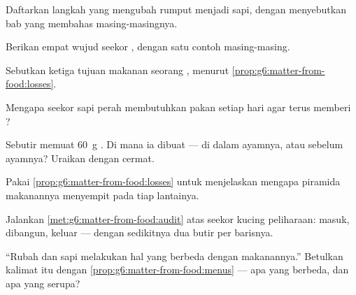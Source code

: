 \begin{exercise}[$\star$]\label{exo:g6:matter-from-food:2}
Daftarkan langkah yang mengubah rumput menjadi  sapi, dengan
menyebutkan bab yang membahas masing-masingnya.
\end{exercise}

\begin{exercise}[$\star$]\label{exo:g6:matter-from-food:3}
Berikan empat wujud  seekor , dengan satu contoh
masing-masing.
\end{exercise}

\begin{exercise}[$\star$]\label{exo:g6:matter-from-food:4}
Sebutkan ketiga tujuan makanan seorang , menurut
\cref{prop:g6:matter-from-food:losses}.
\end{exercise}

\begin{exercise}[$\star$]\label{exo:g6:matter-from-food:5}
Mengapa seekor sapi perah membutuhkan pakan setiap hari agar terus
memberi ?
\end{exercise}

\begin{exercise}[$\star$]\label{exo:g6:matter-from-food:6}
Sebutir  memuat \qty{60}{g} . Di mana ia dibuat ---
di dalam ayamnya, atau sebelum ayamnya? Uraikan dengan cermat.
\end{exercise}

\begin{exercise}[$\star\star$]\label{exo:g6:matter-from-food:7}
Pakai \cref{prop:g6:matter-from-food:losses} untuk menjelaskan mengapa
piramida makanannya menyempit pada tiap lantainya.
\end{exercise}

\begin{exercise}[$\star\star$]\label{exo:g6:matter-from-food:8}
Jalankan \cref{met:g6:matter-from-food:audit} atas seekor kucing
peliharaan: masuk, dibangun, keluar --- dengan sedikitnya dua butir
per barisnya.
\end{exercise}

\begin{exercise}[$\star\star$]\label{exo:g6:matter-from-food:9}
``Rubah dan sapi melakukan hal yang berbeda dengan makanannya.''
Betulkan kalimat itu dengan
\cref{prop:g6:matter-from-food:menus} --- apa yang berbeda, dan apa
yang serupa?
\end{exercise}

